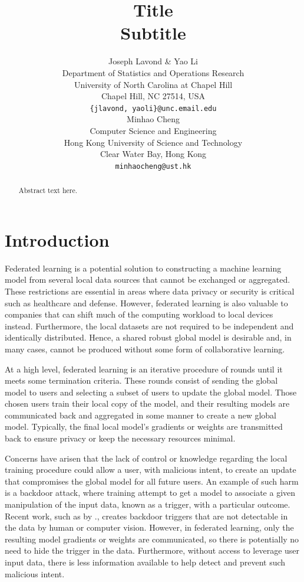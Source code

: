 \documentclass{article} %
\title{Title \\ Subtitle}
\author{%
    Joseph Lavond \& Yao Li  \\
    Department of Statistics and Operations Research \\
    University of North Carolina at Chapel Hill \\
    Chapel Hill, NC 27514, USA \\
    \texttt{\{jlavond, yaoli\}@unc.email.edu} \\
    \And
    Minhao Cheng \\
    Computer Science and Engineering \\
    Hong Kong University of Science and Technology \\
    Clear Water Bay, Hong Kong \\
    \texttt{minhaocheng@ust.hk}
}
\begin{document}
\maketitle

\begin{abstract}
Abstract text here.
\end{abstract}

\section{Introduction}

Federated learning is a potential solution to constructing a machine learning model from several local data sources that cannot be exchanged or aggregated. These restrictions are essential in areas where data privacy or security is critical such as healthcare and defense. However, federated learning is also valuable to companies that can shift much of the computing workload to local devices instead. Furthermore, the local datasets are not required to be independent and identically distributed. Hence, a shared robust global model is desirable and, in many cases, cannot be produced without some form of collaborative learning.

At a high level, federated learning is an iterative procedure of rounds until it meets some termination criteria. These rounds consist of sending the global model to users and selecting a subset of users to update the global model. Those chosen users train their local copy of the model, and their resulting models are communicated back and aggregated in some manner to create a new global model. Typically, the final local model's gradients or weights are transmitted back to ensure privacy or keep the necessary resources minimal. 

Concerns have arisen that the lack of control or knowledge regarding the local training procedure could allow a user, with malicious intent, to create an update that compromises the global model for all future users. An example of such harm is a backdoor attack, where training attempt to get a model to associate a given manipulation of the input data, known as a trigger, with a particular outcome. Recent work, such as by \cite{stamp-invisible}., creates backdoor triggers that are not detectable in the data by human or computer vision. However, in federated learning, only the resulting model gradients or weights are communicated, so there is potentially no need to hide the trigger in the data. Furthermore, without access to leverage user input data, there is less information available to help detect and prevent such malicious intent.
\end{document}
